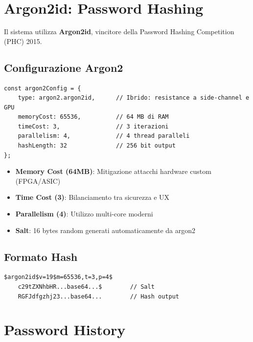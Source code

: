 \documentclass[12pt,a4paper]{report}
\begin{document}
\section{Argon2id: Password Hashing}

Il sistema utilizza \textbf{Argon2id}, vincitore della Password Hashing Competition (PHC) 2015.

\subsection{Configurazione Argon2}

\begin{lstlisting}[caption={Argon2 Configuration}, label={lst:argon2}]
const argon2Config = {
    type: argon2.argon2id,      // Ibrido: resistance a side-channel e GPU
    memoryCost: 65536,          // 64 MB di RAM
    timeCost: 3,                // 3 iterazioni
    parallelism: 4,             // 4 thread paralleli
    hashLength: 32              // 256 bit output
};
\end{lstlisting}

\begin{secbox}
\begin{itemize}
    \item \textbf{Memory Cost (64MB)}: Mitigazione attacchi hardware custom (FPGA/ASIC)
    \item \textbf{Time Cost (3)}: Bilanciamento tra sicurezza e UX
    \item \textbf{Parallelism (4)}: Utilizzo multi-core moderni
    \item \textbf{Salt}: 16 bytes random generati automaticamente da argon2
\end{itemize}
\end{secbox}

\subsection{Formato Hash}

\begin{lstlisting}[caption={Esempio Hash Argon2id}]
$argon2id$v=19$m=65536,t=3,p=4$
    c29tZXNhbHR...base64...$        // Salt
    RGFJdfgzhj23...base64...        // Hash output
\end{lstlisting}

\section{Password History}
\end{document}
